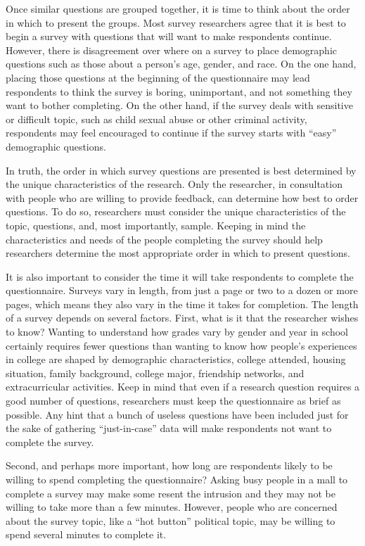 Once similar questions are grouped together, it is time to think about the order in which to present the groups. Most survey researchers agree that it is best to begin a survey with questions that will want to make respondents continue\cite{dillman2011mail}. However, there is disagreement over where on a survey to place demographic questions such as those about a person's age, gender, and race. On the one hand, placing those questions at the beginning of the questionnaire may lead respondents to think the survey is boring, unimportant, and not something they want to bother completing. On the other hand, if the survey deals with sensitive or difficult topic, such as child sexual abuse or other criminal activity, respondents may feel encouraged to continue if the survey starts with ``easy'' demographic questions.

In truth, the order in which survey questions are presented is best determined by the unique characteristics of the research. Only the researcher, in consultation with people who are willing to provide feedback, can determine how best to order questions. To do so, researchers must consider the unique characteristics of the topic, questions, and, most importantly, sample. Keeping in mind the characteristics and needs of the people completing the survey should help researchers determine the most appropriate order in which to present questions.

It is also important to consider the time it will take respondents to complete the questionnaire. Surveys vary in length, from just a page or two to a dozen or more pages, which means they also vary in the time it takes for completion. The length of a survey depends on several factors. First, what is it that the researcher wishes to know? Wanting to understand how grades vary by gender and year in school certainly requires fewer questions than wanting to know how people's experiences in college are shaped by demographic characteristics, college attended, housing situation, family background, college major, friendship networks, and extracurricular activities. Keep in mind that even if a research question requires a good number of questions, researchers must keep the questionnaire as brief as possible. Any hint that a bunch of useless questions have been included just for the sake of gathering ``just-in-case'' data will make respondents not want to complete the survey.

Second, and perhaps more important, how long are respondents likely to be willing to spend completing the questionnaire? Asking busy people in a mall to complete a survey may make some resent the intrusion and they may not be willing to take more than a few minutes. However, people who are concerned about the survey topic, like a ``hot button'' political topic, may be willing to spend several minutes to complete it.

